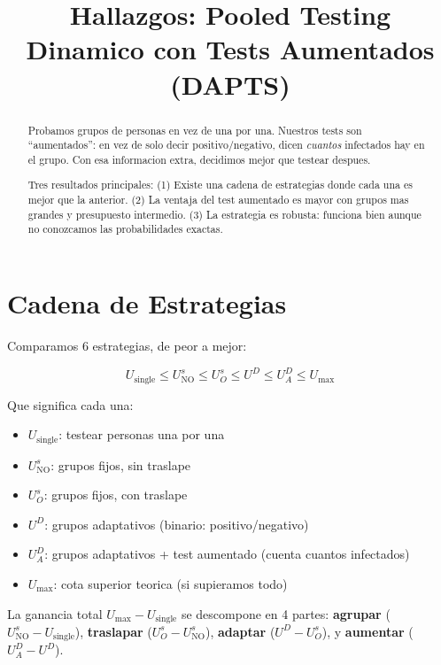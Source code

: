 \documentclass[11pt]{article}
\title{Hallazgos: Pooled Testing Dinamico con Tests Aumentados (DAPTS)}
\author{}
\date{}
\begin{document}
\maketitle

\begin{abstract}
Probamos grupos de personas en vez de una por una.
Nuestros tests son ``aumentados'': en vez de solo decir positivo/negativo,
dicen \emph{cuantos} infectados hay en el grupo.
Con esa informacion extra, decidimos mejor que testear despues.

Tres resultados principales:
(1) Existe una cadena de estrategias donde cada una es mejor que la anterior.
(2) La ventaja del test aumentado es mayor con grupos mas grandes y presupuesto intermedio.
(3) La estrategia es robusta: funciona bien aunque no conozcamos las probabilidades exactas.
\end{abstract}

\section{Cadena de Estrategias}
\label{sec:chain}

Comparamos 6 estrategias, de peor a mejor:

\begin{equation}
  U_{\text{single}} \leq U^s_{\text{NO}} \leq U^s_O \leq U^D \leq U^D_A \leq U_{\max}
  \label{eq:chain}
\end{equation}

Que significa cada una:
\begin{itemize}
  \item $U_{\text{single}}$: testear personas una por una
  \item $U^s_{\text{NO}}$: grupos fijos, sin traslape
  \item $U^s_O$: grupos fijos, con traslape
  \item $U^D$: grupos adaptativos (binario: positivo/negativo)
  \item $U^D_A$: grupos adaptativos + test aumentado (cuenta cuantos infectados)
  \item $U_{\max}$: cota superior teorica (si supieramos todo)
\end{itemize}

La ganancia total $U_{\max} - U_{\text{single}}$ se descompone en 4 partes:
\textbf{agrupar} ($U^s_{\text{NO}} - U_{\text{single}}$),
\textbf{traslapar} ($U^s_O - U^s_{\text{NO}}$),
\textbf{adaptar} ($U^D - U^s_O$), y
\textbf{aumentar} ($U^D_A - U^D$).
\end{document}
